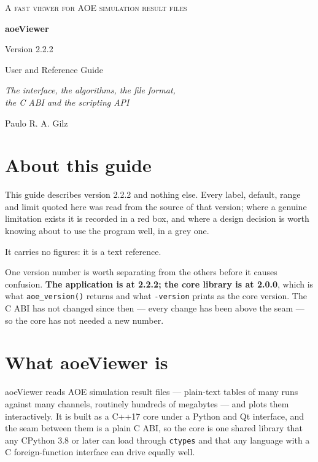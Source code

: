 \documentclass[11pt,a4paper,oneside]{report}
\newcommand{\appver}{2.2.2}
\newcommand{\code}[1]{\texttt{#1}}
\begin{document}
\begin{titlepage}
\centering
\vspace*{3cm}
{\small\scshape\color{aoeaccent} A fast viewer for AOE simulation result files\par}
\vspace{2.2cm}
{\Huge\bfseries aoeViewer\par}
\vspace{0.5cm}
{\Large Version \appver\par}
\vspace{2.4cm}
{\LARGE User and Reference Guide\par}
\vspace{0.6cm}
{\large\itshape The interface, the algorithms, the file format,\\
the C ABI and the scripting API\par}
\vspace{3cm}
{\large Paulo R. A. Gilz\par}
\vfill
\end{titlepage}

\tableofcontents
\clearpage

\chapter*{About this guide}

This guide describes version \appver{} and nothing else. Every label, default,
range and limit quoted here was read from the source of that version; where a
genuine limitation exists it is recorded in a red box, and where a design
decision is worth knowing about to use the program well, in a grey one.

It carries no figures: it is a text reference.

One version number is worth separating from the others before it causes
confusion. \textbf{The application is at \appver; the core library is at
2.0.0}, which is what \code{aoe\_version()} returns and what \code{-version}
prints as the core version. The C ABI has not changed since then --- every
change has been above the seam --- so the core has not needed a new number.

\chapter{What aoeViewer is}

aoeViewer reads AOE simulation result files --- plain-text tables of many runs
against many channels, routinely hundreds of megabytes --- and plots them
interactively. It is built as a C++17 core under a Python and Qt interface, and
the seam between them is a plain C ABI, so the core is one shared library that
any CPython 3.8 or later can load through \code{ctypes} and that any language
with a C foreign-function interface can drive equally well.
\end{document}
